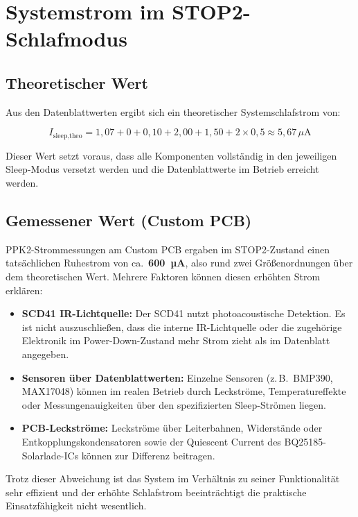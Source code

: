 \section*{Systemstrom im STOP2-Schlafmodus}

\subsection*{Theoretischer Wert}

Aus den Datenblattwerten ergibt sich ein theoretischer Systemschlafstrom von:

\[
  I_{\text{sleep,theo}} = 1{,}07 + 0 + 0{,}10 + 2{,}00 + 1{,}50 + 2 \times 0{,}5 \approx 5{,}67\,\mu\text{A}
\]

Dieser Wert setzt voraus, dass alle Komponenten vollständig in den jeweiligen Sleep-Modus versetzt werden und die Datenblattwerte im Betrieb erreicht werden.

\subsection*{Gemessener Wert (Custom PCB)}

PPK2-Strommessungen am Custom PCB ergaben im STOP2-Zustand einen tatsächlichen Ruhestrom von ca.\ \textbf{600~µA}, also rund zwei Größenordnungen über dem theoretischen Wert. Mehrere Faktoren können diesen erhöhten Strom erklären:

\begin{itemize}
  \item \textbf{SCD41 IR-Lichtquelle:} Der SCD41 nutzt photoacoustische Detektion. Es ist nicht auszuschließen, dass die interne IR-Lichtquelle oder die zugehörige Elektronik im Power-Down-Zustand mehr Strom zieht als im Datenblatt angegeben.
  \item \textbf{Sensoren über Datenblattwerten:} Einzelne Sensoren (z.\,B.\ BMP390, MAX17048) können im realen Betrieb durch Leckströme, Temperatureffekte oder Messungenauigkeiten über den spezifizierten Sleep-Strömen liegen.
  \item \textbf{PCB-Leckströme:} Leckströme über Leiterbahnen, Widerstände oder Entkopplungskondensatoren sowie der Quiescent Current des BQ25185-Solarlade-ICs können zur Differenz beitragen.
\end{itemize}

Trotz dieser Abweichung ist das System im Verhältnis zu seiner Funktionalität sehr effizient und der erhöhte Schlafstrom beeinträchtigt die praktische Einsatzfähigkeit nicht wesentlich.

